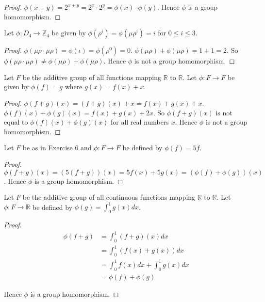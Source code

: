 \begin{proof}
    $\phi(x + y) = {2}^{x+y} = {2}^{x}\cdot {2}^{y} = \phi(x)\cdot\phi(y)$. Hence $\phi$ is a group homomorphism.
\end{proof}

\begin{exercise}
    Let $\phi: D_{4} \to \mathbb{Z}_{4}$ be given by $\phi(\rho^{i}) = \phi(\mu\rho^{i}) = i$ for $0\leq i\leq 3$.
\end{exercise}

\begin{proof}
    $\phi(\mu\rho\cdot\mu\rho) = \phi(\iota) = \phi(\rho^{0}) = 0$. $\phi(\mu\rho) + \phi(\mu\rho) = 1 + 1 = 2$. So $\phi(\mu\rho\cdot\mu\rho) \ne \phi(\mu\rho) + \phi(\mu\rho)$. Hence $\phi$ is not a group homomorphism.
\end{proof}

\begin{exercise}
    Let $F$ be the additive group of all functions mapping $\mathbb{R}$ to $\mathbb{R}$. Let $\phi: F \to F$ be given by $\phi(f) = g$ where $g(x) = f(x) + x$.
\end{exercise}

\begin{proof}
    $\phi(f + g)(x) = (f + g)(x) + x = f(x) + g(x) + x$. $\phi(f)(x) + \phi(g)(x) = f(x) + g(x) + 2x$. So $\phi(f + g)(x)$ is not equal to $\phi(f)(x) + \phi(g)(x)$ for all real numbers $x$. Hence $\phi$ is not a group homomorphism.
\end{proof}

\begin{exercise}
    Let $F$ be as in Exercise 6 and $\phi: F \to F$ be defined by $\phi(f) = 5f$.
\end{exercise}

\begin{proof}
    $\phi(f + g)(x) = (5(f + g))(x) = 5f(x) + 5g(x) = (\phi(f) + \phi(g))(x)$. Hence $\phi$ is a group homomorphism.
\end{proof}

\begin{exercise}
    Let $F$ be the additive group of all continuous functions mapping $\mathbb{R}$ to $\mathbb{R}$. Let $\phi: F\to \mathbb{R}$ be defined by $\phi(g) = \int^{1}_{0}g(x)dx$.
\end{exercise}

\begin{proof}
    \begin{align*}
        \phi(f + g) & = \int^{1}_{0}(f + g)(x)dx                \\
                    & = \int^{1}_{0}(f(x) + g(x))dx             \\
                    & = \int^{1}_{0}f(x)dx + \int^{1}_{0}g(x)dx \\
                    & = \phi(f) + \phi(g)
    \end{align*}

    Hence $\phi$ is a group homomorphism.
\end{proof}

